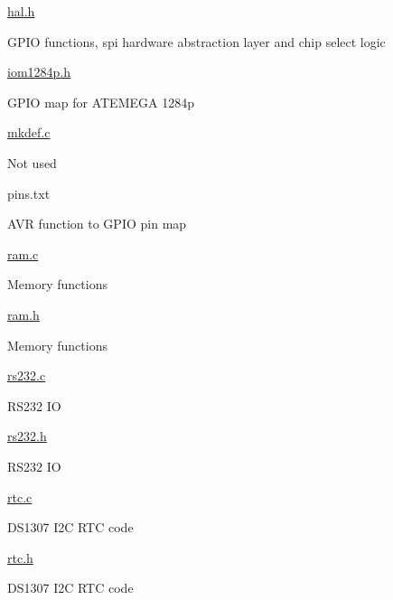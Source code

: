 \begin{DoxyItemize}
\begin{DoxyItemize}
\item \hyperlink{hal_8h}{hal.\+h}
\begin{DoxyItemize}
\item G\+P\+IO functions, spi hardware abstraction layer and chip select logic
\end{DoxyItemize}
\item \hyperlink{iom1284p_8h}{iom1284p.\+h}
\begin{DoxyItemize}
\item G\+P\+IO map for A\+T\+E\+M\+E\+GA 1284p
\end{DoxyItemize}
\item \hyperlink{mkdef_8c}{mkdef.\+c}
\begin{DoxyItemize}
\item Not used
\end{DoxyItemize}
\item pins.\+txt
\begin{DoxyItemize}
\item A\+VR function to G\+P\+IO pin map
\end{DoxyItemize}
\item \hyperlink{ram_8c}{ram.\+c}
\begin{DoxyItemize}
\item Memory functions
\end{DoxyItemize}
\item \hyperlink{ram_8h}{ram.\+h}
\begin{DoxyItemize}
\item Memory functions
\end{DoxyItemize}
\item \hyperlink{rs232_8c}{rs232.\+c}
\begin{DoxyItemize}
\item R\+S232 IO
\end{DoxyItemize}
\item \hyperlink{rs232_8h}{rs232.\+h}
\begin{DoxyItemize}
\item R\+S232 IO
\end{DoxyItemize}
\item \hyperlink{rtc_8c}{rtc.\+c}
\begin{DoxyItemize}
\item D\+S1307 I2C R\+TC code
\end{DoxyItemize}
\item \hyperlink{rtc_8h}{rtc.\+h}
\begin{DoxyItemize}
\item D\+S1307 I2C R\+TC code
\end{DoxyItemize}

\end{DoxyItemize}
\end{DoxyItemize}
